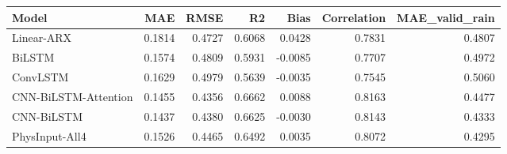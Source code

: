 \begin{tabular}{lrrrrrr}
\toprule
               Model &    MAE &   RMSE &     R2 &    Bias &  Correlation &  MAE\_valid\_rain \\
\midrule
          Linear-ARX & 0.1814 & 0.4727 & 0.6068 &  0.0428 &       0.7831 &          0.4807 \\
              BiLSTM & 0.1574 & 0.4809 & 0.5931 & -0.0085 &       0.7707 &          0.4972 \\
            ConvLSTM & 0.1629 & 0.4979 & 0.5639 & -0.0035 &       0.7545 &          0.5060 \\
CNN-BiLSTM-Attention & 0.1455 & 0.4356 & 0.6662 &  0.0088 &       0.8163 &          0.4477 \\
          CNN-BiLSTM & 0.1437 & 0.4380 & 0.6625 & -0.0030 &       0.8143 &          0.4333 \\
      PhysInput-All4 & 0.1526 & 0.4465 & 0.6492 &  0.0035 &       0.8072 &          0.4295 \\
\bottomrule
\end{tabular}
